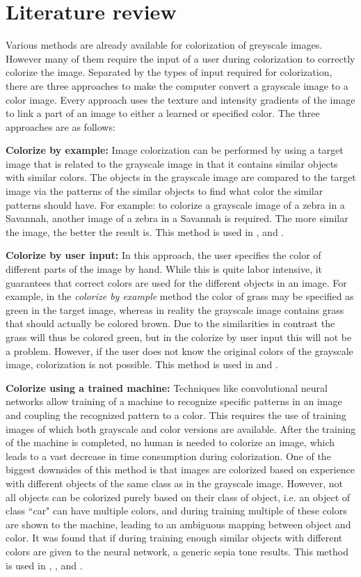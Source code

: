 \section{Literature review}
Various methods are already available for colorization of greyscale images. However many of them require the input of a user during colorization to correctly colorize the image. Separated by the types of input required for colorization, there are three approaches to make the computer convert a grayscale image to a color image. Every approach uses the texture and intensity gradients of the image to link a part of an image to either a learned or specified color. The three approaches are as follows:

\textbf{Colorize by example:} Image colorization can be performed by using a target image that is related to the grayscale image in that it contains similar objects with similar colors. The objects in the grayscale image are compared to the target image via the patterns of the similar objects to find what color the similar patterns should have. For example: to colorize a grayscale image of a zebra in a Savannah, another image of a zebra in a Savannah is required. The more similar the image, the better the result is. This method is used in \cite{Charpiat}, \cite{Gupta} and \cite{Zheng}.

\textbf{Colorize by user input:} In this approach, the user specifies the color of different parts of the image by hand. While this is quite labor intensive, it guarantees that correct colors are used for the different objects in an image. For example, in the \textit{colorize by example} method the color of grass may be specified as green in the target image, whereas in reality the grayscale image contains grass that should actually be colored brown. Due to the similarities in contrast the grass will thus be colored green, but in the colorize by user input this will not be a problem. However, if the user does not know the original colors of the grayscale image, colorization is not possible. This method is used in \cite{Horiuchi} and \cite{Levin}.

\textbf{Colorize using a trained machine:} Techniques like convolutional neural networks allow training of a machine to recognize specific patterns in an image and coupling the recognized pattern to a color. This requires the use of training images of which both grayscale and color versions are available. After the training of the machine is completed, no human is needed to colorize an image, which leads to a vast decrease in time consumption during colorization. One of the biggest downsides of this method is that images are colorized based on experience with different objects of the same class as in the grayscale image. However, not all objects can be colorized purely based on their class of object, i.e. an object of class ``car" can have multiple colors, and during training multiple of these colors are shown to the machine, leading to an ambiguous mapping between object and color. It was found that if during training enough similar objects with different colors are given to the neural network, a generic sepia tone results. This method is used in \cite{Cheng}, \cite{Ho}, \cite{Krizhevsky} and \cite{Dahl}.

